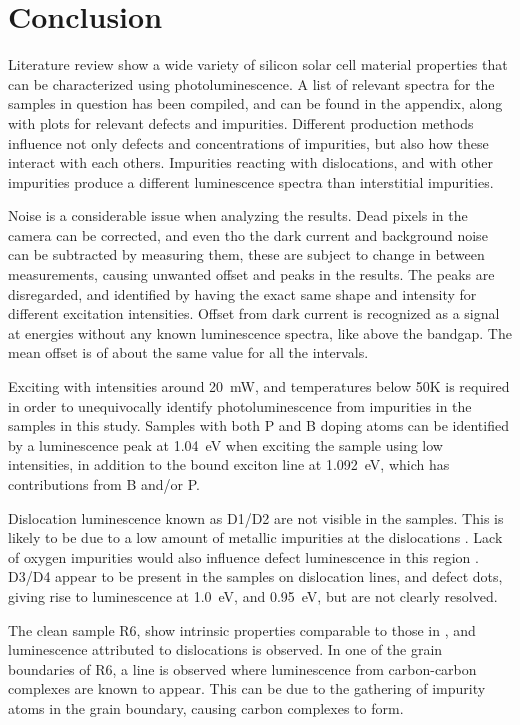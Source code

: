 \section{Conclusion}

Literature review show a wide variety of silicon solar cell material properties that can be characterized using photoluminescence. A list of relevant spectra for the samples in question has been compiled, and can be found in the appendix, along with plots for relevant defects and impurities. Different production methods influence not only defects and concentrations of impurities, but also how these interact with each others. Impurities reacting with dislocations, and with other impurities produce a different luminescence spectra than interstitial impurities.


Noise is a considerable issue when analyzing the results. Dead pixels in the camera can be corrected, and even tho the dark current and background noise can be subtracted by measuring them, these are subject to change in between measurements, causing unwanted offset and peaks in the results. The peaks are disregarded, and identified by having the exact same shape and intensity for different excitation intensities. Offset from dark current is recognized as a signal at energies without any known luminescence spectra, like above the bandgap. The mean offset is of about the same value for all the intervals.

Exciting with intensities around 20~mW, and temperatures below 50K is required in order to unequivocally identify photoluminescence from impurities in the samples in this study. Samples with both P and B doping atoms can be identified by a luminescence peak at 1.04~eV when exciting the sample using low intensities, in addition to the bound exciton line at 1.092~eV, which has contributions from B and/or P. 


Dislocation luminescence known as D1/D2 are not visible in the samples. This is likely to be due to a low amount of metallic impurities at the 
dislocations \cite{arguirov07}. Lack of oxygen impurities would also influence defect luminescence in this region \cite{inoue07}. D3/D4 appear to be present in the samples on dislocation lines, and defect dots, giving rise to luminescence at 1.0~eV, and 0.95~eV, but are not clearly resolved.

The clean sample R6, show intrinsic properties comparable to those in \cite{dean67}, and luminescence attributed to dislocations is observed. In one of the grain boundaries of R6, a line is observed where luminescence from carbon-carbon complexes are known to appear. This can be due to the gathering of impurity atoms in the grain boundary, causing carbon complexes to form.

